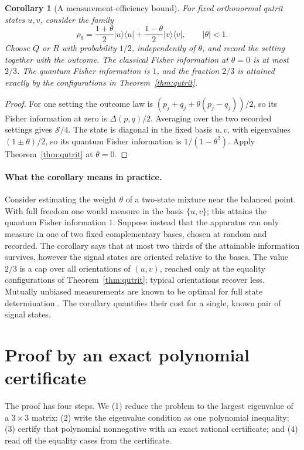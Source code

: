 \documentclass[11pt,a4paper]{article}
\numberwithin{equation}{section}
\newtheorem{corollary}[theorem]{Corollary}
\theoremstyle{remark}\newtheorem{remark}[theorem]{Remark}
\newcommand{\proj}[1]{|#1\rangle\langle #1|}
\begin{document}
\begin{corollary}[A measurement-efficiency bound]\label{cor:fisher}
For fixed orthonormal qutrit states $u,v$, consider the family
\[
\rho_\theta=\frac{1+\theta}{2}\proj{u}+\frac{1-\theta}{2}\proj{v},\qquad |\theta|<1.
\]
Choose $Q$ or $R$ with probability $1/2$, independently of $\theta$, and record the setting together with the outcome. The classical Fisher information at $\theta=0$ is at most $2/3$. The quantum Fisher information is $1$, and the fraction $2/3$ is attained exactly by the configurations in Theorem~\ref{thm:qutrit}.
\end{corollary}
\begin{proof}
For one setting the outcome law is $(p_j+q_j+\theta(p_j-q_j))/2$, so its Fisher information at zero is $\Delta(p,q)/2$. Averaging over the two recorded settings gives $\mathcal S/4$. The state is diagonal in the fixed basis $u,v$, with eigenvalues $(1\pm\theta)/2$, so its quantum Fisher information is $1/(1-\theta^2)$. Apply Theorem~\ref{thm:qutrit} at $\theta=0$.
\end{proof}

\paragraph{What the corollary means in practice.}
Consider estimating the weight $\theta$ of a two-state mixture near the balanced point. With full freedom one would measure in the basis $\{u,v\}$; this attains the quantum Fisher information $1$. Suppose instead that the apparatus can only measure in one of two fixed complementary bases, chosen at random and recorded. The corollary says that at most two thirds of the attainable information survives, however the signal states are oriented relative to the bases. The value $2/3$ is a cap over all orientations of $(u,v)$, reached only at the equality configurations of Theorem~\ref{thm:qutrit}; typical orientations recover less. Mutually unbiased measurements are known to be optimal for full state determination \cite{wootters}. The corollary quantifies their cost for a single, known pair of signal states.

\section{Proof by an exact polynomial certificate}\label{sec:proof}
The proof has four steps. We (1) reduce the problem to the largest eigenvalue of a $3\times3$ matrix; (2) write the eigenvalue condition as one polynomial inequality; (3) certify that polynomial nonnegative with an exact rational certificate; and (4) read off the equality cases from the certificate.
\end{document}
